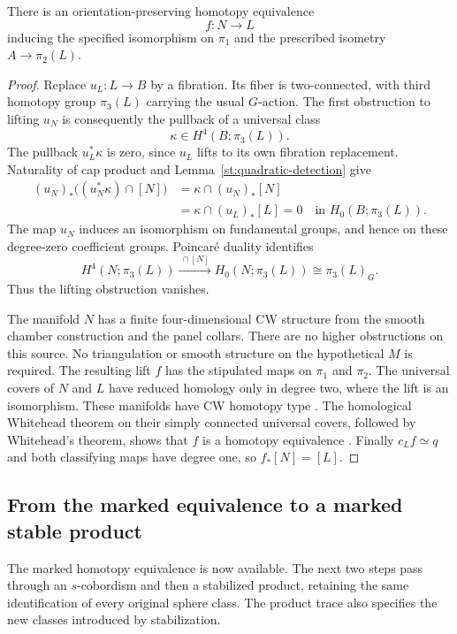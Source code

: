 \begin{proposition}\label{st:marked-equivalence}
There is an orientation-preserving homotopy equivalence
\[
 f\colon N\longrightarrow L
\]
inducing the specified isomorphism on $\pi_1$ and the prescribed
isometry $A\to\pi_2(L)$.
\end{proposition}

\begin{proof}
Replace $u_L\colon L\to B$ by a fibration.  Its fiber is
two-connected, with third homotopy group $\pi_3(L)$ carrying the
usual $G$-action.  The first obstruction to lifting $u_N$ is consequently
the pullback of a universal class
\[
 \kappa\in H^4(B;\pi_3(L)).
\]
The pullback $u_L^*\kappa$ is zero, since $u_L$ lifts to its own
fibration replacement.  Naturality of cap product and
Lemma~\ref{st:quadratic-detection} give
\begin{align*}
 (u_N)_*\bigl((u_N^*\kappa)\mathbin{\cap}[N]\bigr)
 &=\kappa\mathbin{\cap}(u_N)_*[N]\\
 &=\kappa\mathbin{\cap}(u_L)_*[L]=0
 \quad\text{in }H_0(B;\pi_3(L)).
\end{align*}
The map $u_N$ induces an isomorphism on fundamental groups, and hence
on these degree-zero coefficient groups.  Poincar\'e duality identifies
\[
 H^4(N;\pi_3(L))\xrightarrow{\ \cap[N]\ }
 H_0(N;\pi_3(L))\cong\pi_3(L)_G.
\]
Thus the lifting obstruction vanishes.

The manifold $N$ has a finite four-dimensional CW structure from the
smooth chamber construction and the panel collars.  There are no
higher obstructions on this source.  No triangulation or smooth
structure on the hypothetical $M$ is required.  The resulting lift
$f$ has the stipulated maps on $\pi_1$ and $\pi_2$.  The universal
covers of $N$ and $L$ have reduced homology only in degree two, where
the lift is an isomorphism. These manifolds have CW homotopy type
\cite[Corollary~1]{MilnorCW}. The homological Whitehead theorem on their
simply connected universal covers, followed by Whitehead's theorem,
shows that $f$ is a homotopy equivalence
\cite[Corollary~4.33 and Theorem~4.5]{Hatcher}.
Finally $c_Lf\simeq q$ and both classifying maps have degree one, so
$f_*[N]=[L]$.
\end{proof}

\subsection{From the marked equivalence to a marked stable product}

The marked homotopy equivalence is now available. The next two steps
pass through an $s$-cobordism and then a stabilized product, retaining
the same identification of every original sphere class. The product
trace also specifies the new classes introduced by stabilization.

